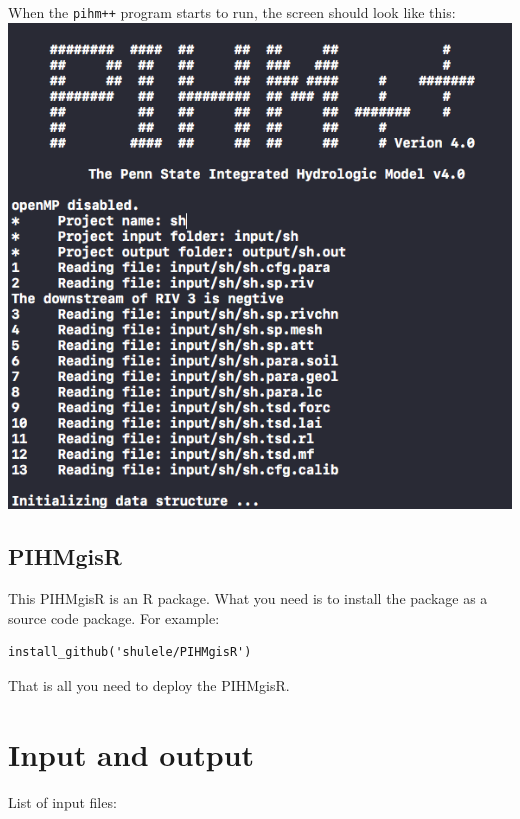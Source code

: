 \documentclass[]{scrbook}
\begin{document}
When the \texttt{pihm++} program starts to run, the screen should look
like this: \includegraphics{Fig/CLI_SH.png}

\section{PIHMgisR}\label{pihmgisr}

This PIHMgisR is an R package. What you need is to install the package
as a source code package. For example:

\begin{verbatim}
install_github('shulele/PIHMgisR')
\end{verbatim}

That is all you need to deploy the PIHMgisR.

\chapter{Input and output}\label{input-and-output}

List of input files:
\end{document}
